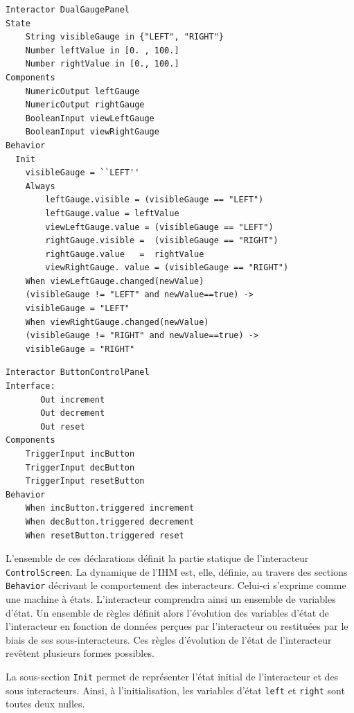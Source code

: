 \documentclass{ihm}
\begin{document}
\begin{lstlisting}[float=htb!,
                   mathescape,
                   caption=Panneau de deux jauges,
                   label=dualgaugepanel,
                   frame=single]
Interactor DualGaugePanel
State
	String visibleGauge in {"LEFT", "RIGHT"}
	Number leftValue in [0. , 100.]
	Number rightValue in [0., 100.]
Components
	NumericOutput leftGauge
	NumericOutput rightGauge
	BooleanInput viewLeftGauge
	BooleanInput viewRightGauge
Behavior
  Init
    visibleGauge = ``LEFT''
	Always
		leftGauge.visible = (visibleGauge == "LEFT")
		leftGauge.value = leftValue
		viewLeftGauge.value = (visibleGauge == "LEFT")
		rightGauge.visible =  (visibleGauge == "RIGHT")
		rightGauge.value   =  rightValue
		viewRightGauge. value = (visibleGauge == "RIGHT")
	When viewLeftGauge.changed(newValue)
	(visibleGauge != "LEFT" and newValue==true) -> 
    visibleGauge = "LEFT"
	When viewRightGauge.changed(newValue)
	(visibleGauge != "RIGHT" and newValue==true) -> 
    visibleGauge = "RIGHT"
\end{lstlisting}


\begin{lstlisting}[float=htb!,
                   mathescape,
                   caption=Panneau des boutons,
                   label=buttoncontrolpanel,
                   frame=single]
Interactor ButtonControlPanel 
Interface: 
	   Out increment
	   Out decrement
	   Out reset
Components
	TriggerInput incButton
	TriggerInput decButton
	TriggerInput resetButton
Behavior
	When incButton.triggered increment
	When decButton.triggered decrement
	When resetButton.triggered reset
\end{lstlisting}

L'ensemble  de   ces  déclarations  définit  la   partie  statique  de
l'interacteur  \lstinline$ControlScreen$. La  dynamique de  l'IHM est,
elle, définie, au travers  des sections \lstinline$Behavior$ décrivant
le comportement des interacteurs. Celui-ci s'exprime comme une machine
à  états.  L'interacteur  comprendra  ainsi un  ensemble de  variables
d'état. Un ensemble de règles  définit alors l'évolution des variables
d'état   de  l'interacteur   en  fonction   de  données   perçues  par
l'interacteur ou restituées par le biais de ses sous-interacteurs. Ces
règles  d'évolution  de  l'état de  l'interacteur  revêtent  plusieurs
formes possibles. 

La sous-section \lstinline$Init$ permet  de représenter l'état initial
de l'interacteur et des  sous interacteurs. Ainsi, à l'initialisation,
les variables d'état \lstinline$left$ et \lstinline$right$ sont toutes
deux nulles.
\end{document}
